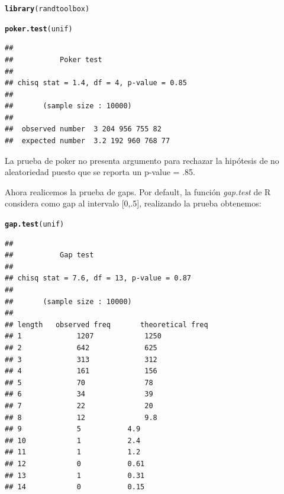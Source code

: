 \documentclass[12 pt]{article}\usepackage[]{graphicx}\usepackage[]{color}
\makeatletter
\newcommand{\hlstd}[1]{\textcolor[rgb]{0.345,0.345,0.345}{#1}}%
\newcommand{\hlkwd}[1]{\textcolor[rgb]{0.737,0.353,0.396}{\textbf{#1}}}%
\newenvironment{kframe}{%
 \def\at@end@of@kframe{}%
 \ifinner\ifhmode%
  \def\at@end@of@kframe{\end{minipage}}%
  \begin{minipage}{\columnwidth}%
 \fi\fi%
 \def\FrameCommand##1{\hskip\@totalleftmargin \hskip-\fboxsep
 \colorbox{shadecolor}{##1}\hskip-\fboxsep
     \hskip-\linewidth \hskip-\@totalleftmargin \hskip\columnwidth}%
 \MakeFramed {\advance\hsize-\width
   \@totalleftmargin\z@ \linewidth\hsize
   \@setminipage}}%
 {\par\unskip\endMakeFramed%
 \at@end@of@kframe}
\newenvironment{knitrout}{}{} %
\makeatother
\begin{document}
\begin{enumerate}
\begin{knitrout}
\color{fgcolor}\begin{kframe}
\begin{alltt}
\hlkwd{library}\hlstd{(randtoolbox)}
\end{alltt}


{\ttfamily\noindent\itshape\color{messagecolor}{\#\# Loading required package: rngWELL}}

{\ttfamily\noindent\itshape{}}

{\ttfamily\noindent\itshape\color{messagecolor}{\#\# \\\#\# Attaching package: 'randtoolbox'}}

{\ttfamily\noindent\itshape\color{messagecolor}{\#\# The following object is masked from 'package:randtests':\\\#\# \\\#\#\ \ \ \  permut}}\begin{alltt}
\hlkwd{poker.test}\hlstd{(unif)}
\end{alltt}
\begin{verbatim}
## 
## 			 Poker test
## 
## chisq stat = 1.4, df = 4, p-value = 0.85
## 
## 		 (sample size : 10000)
## 
## 	observed number	 3 204 956 755 82 
## 	expected number	 3.2 192 960 768 77
\end{verbatim}
\end{kframe}
\end{knitrout}

La prueba de poker no presenta argumento para rechazar la hipótesis de no aleatoriedad puesto que se reporta un p-value = .85.

Ahora realicemos la prueba de gaps. Por default, la función \textit{gap.test} de R considera como gap al intervalo [0,.5], realizando la prueba obtenemos:

\begin{knitrout}
\color{fgcolor}\begin{kframe}
\begin{alltt}
\hlkwd{gap.test}\hlstd{(unif)}
\end{alltt}
\begin{verbatim}
## 
## 			 Gap test
## 
## chisq stat = 7.6, df = 13, p-value = 0.87
## 
## 		 (sample size : 10000)
## 
## length	observed freq		theoretical freq
## 1 			 1207 			 1250 
## 2 			 642 			 625 
## 3 			 313 			 312 
## 4 			 161 			 156 
## 5 			 70 			 78 
## 6 			 34 			 39 
## 7 			 22 			 20 
## 8 			 12 			 9.8 
## 9 			 5 			 4.9 
## 10 			 1 			 2.4 
## 11 			 1 			 1.2 
## 12 			 0 			 0.61 
## 13 			 1 			 0.31 
## 14 			 0 			 0.15
\end{verbatim}
\end{kframe}
\end{knitrout}


\end{enumerate}
\end{document}

